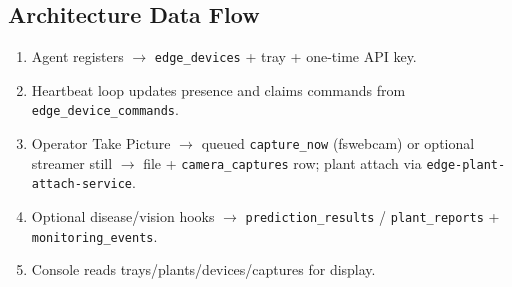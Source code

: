 \documentclass[11pt,letterpaper]{article}
\begin{document}
\subsection{Architecture Data Flow}
\begin{enumerate}
  \item Agent registers $\rightarrow$ \texttt{edge\_devices} + tray + one-time API key.
  \item Heartbeat loop updates presence and claims commands from
        \texttt{edge\_device\_commands}.
  \item Operator Take Picture $\rightarrow$ queued \texttt{capture\_now} (fswebcam) or
        optional streamer still $\rightarrow$ file + \texttt{camera\_captures} row;
        plant attach via \texttt{edge-plant-attach-service}.
  \item Optional disease/vision hooks $\rightarrow$ \texttt{prediction\_results} /
        \texttt{plant\_reports} + \texttt{monitoring\_events}.
  \item Console reads trays/plants/devices/captures for display.
\end{enumerate}
\end{document}
